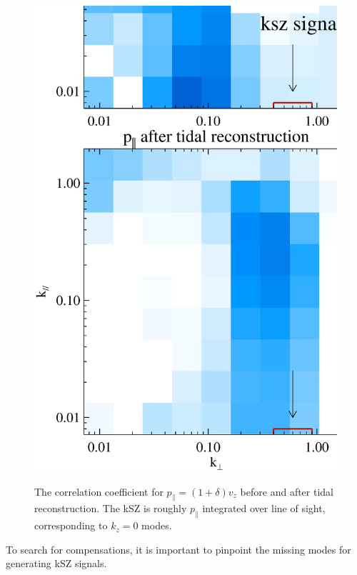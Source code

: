 \begin{figure}
\begin{minipage}[t]{0.3\linewidth}
\label{fig:v}
\end{minipage}
\begin{minipage}[t]{0.3\linewidth}
\begin{center}
\includegraphics[width=\textwidth,height=1.7\textwidth]{figure/powmomen_before_after_tide.eps}
\end{center}
\vspace{-0.7cm}
\label{fig:p}
\caption{The correlation coefficient for $p_\parallel=(1+\delta)v_z$ before and 
after tidal reconstruction. 
The kSZ is roughly $p_\parallel$ integrated over line of sight, 
corresponding to $k_z=0$ modes.}
\end{minipage}
\end{figure}
To search for compensations, 
it is important to pinpoint the missing modes for generating kSZ signals. 

